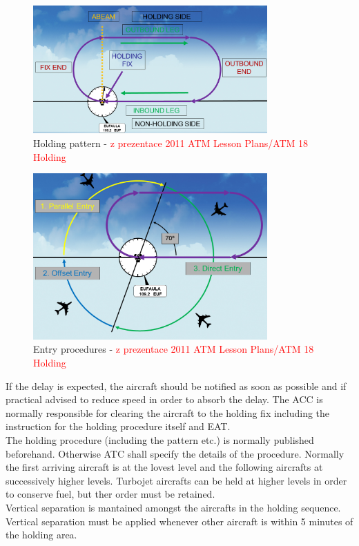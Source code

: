 \begin{figure}[h]
    \centering
    \includegraphics[width=0.8\textwidth]{figures/holding.png}
    \caption{Holding pattern - \textcolor{red}{z prezentace 2011 ATM Lesson Plans/ATM 18 Holding%
    }}
    \label{fig:holding}
\end{figure}
\begin{figure}[h]
    \centering
    \includegraphics[width=0.8\textwidth]{figures/holding-entry.png}
    \caption{Entry procedures - \textcolor{red}{z prezentace 2011 ATM Lesson Plans/ATM 18 Holding%
    }}
    \label{fig:holding-entry}
\end{figure}

If the delay is expected, the aircraft should be notified as soon as possible and if practical advised to reduce speed in order to absorb the delay. The ACC is normally responsible for clearing the aircraft to the holding fix including the instruction for the holding procedure itself and EAT.\\
The holding procedure (including the pattern etc.) is normally published beforehand. Otherwise ATC shall specify the details of the procedure. Normally the first arriving aircraft is at the lovest level and the following aircrafts at successively higher levels. Turbojet aircrafts can be held at higher levels in order to conserve fuel, but ther order must be retained.\\
Vertical separation is mantained amongst the aircrafts in the holding sequence. Vertical separation must be applied whenever other aircraft is within 5 minutes of the holding area.\cite[Chapter 6.5.5]{doc4444}

